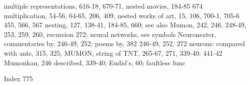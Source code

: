multiple representations, 616-18, 670-71,     nested movies, 184-85
674 multiplication, 54-56, 64-65, 206, 409,   nested works of art, 15, 106, 700-1, 705-6
455, 566, 567                                 nesting, 127, 138-41, 184-85, 660; see also
Mumon, 242, 246, 248-49, 253, 259, 260,       recursion
272;                                          neural networks, see symbols Neuroneater,
commentaries by, 246-49, 252; poems by,       382
246-49, 252, 272                              neurons: compared with ants, 315, 325,
MUMON, string of TNT, 265-67, 271,            339-40;
441-42 Mumonkan, 246                          described, 339-40; Eudid's, 60; faultless
                                              func



Index                                                                                775

